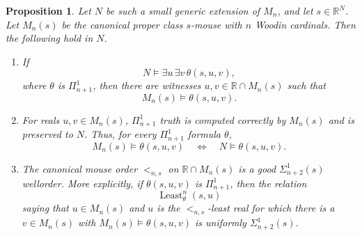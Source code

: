 \documentclass[a4paper,11pt]{article}
\newtheorem{proposition}[theorem]{Proposition}
\begin{document}
\begin{proposition}\label{prop:mn-relativized-capture}
Let $N$ be such a small generic extension of $M_n$, and let
$s\in\mathbb R^N$.  Let $M_n(s)$ be the canonical proper class $s$-mouse with
$n$ Woodin cardinals.  Then the following hold in $N$.
\begin{enumerate}
    \item If
    \[
       N\models \exists u\,\exists v\,\theta(s,u,v),
    \]
    where $\theta$ is $\Pi^1_{n+1}$, then there are witnesses
    $u,v\in\mathbb R\cap M_n(s)$ such that
    \[
       M_n(s)\models \theta(s,u,v).
    \]

    \item For reals $u,v\in M_n(s)$, $\Pi^1_{n+1}$ truth is computed
    correctly by $M_n(s)$ and is preserved to $N$.  Thus, for every
    $\Pi^1_{n+1}$ formula $\theta$,
    \[
       M_n(s)\models\theta(s,u,v)
       \quad\Longleftrightarrow\quad
       N\models\theta(s,u,v).
    \]

    \item The canonical mouse order $<_{n,s}$ on
    $\mathbb R\cap M_n(s)$ is a good $\Sigma^1_{n+2}(s)$ wellorder.  More
    explicitly, if $\theta(s,u,v)$ is $\Pi^1_{n+1}$, then the relation
    \[
       \operatorname{Least}^{n}_{\theta}(s,u)
    \]
    saying that $u\in M_n(s)$ and $u$ is the $<_{n,s}$-least real for which
    there is a $v\in M_n(s)$ with
    $M_n(s)\models\theta(s,u,v)$ is uniformly $\Sigma^1_{n+2}(s)$.
\end{enumerate}
\end{proposition}
\end{document}
